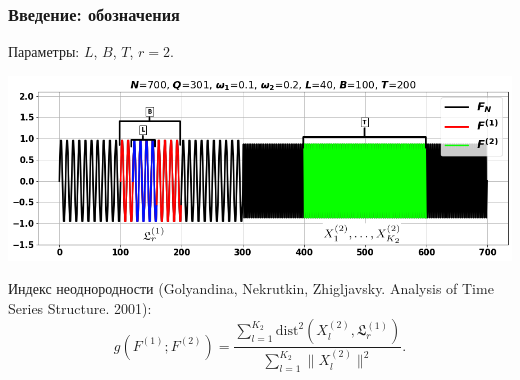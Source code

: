 \documentclass[pdf, 9pt,intlimits, unicode]{beamer}
\DeclareMathOperator{\mathspan}{span}
\newcommand\eqdef{\mathrel{\stackrel{\makebox[0pt]{\mbox{\normalfont\tiny def}}}{=}}}
\begin{document}
	\begin{frame}
		\frametitle{Введение: обозначения}	
		{\color{blue} Параметры:} $ L $, $ B $, $ T $, $ r = 2 $.
		\begin{center}
			\includegraphics[width=\linewidth]{imgs/designations}
		\end{center}

		\bigskip
		
		{\color{blue} Индекс неоднородности} (Golyandina, Nekrutkin, Zhigljavsky. Analysis of Time Series Structure. 2001):
		\small{
			$$ g(F^{(1)}; F^{(2)}) = \frac{\sum\limits_{l=1}^{K_2}\mathrm{dist}^2(X_l^{(2)}, \mathfrak{L}_r^{(1)})}{\sum\limits_{l=1}^{K_2}\|X_l^{(2)}\|^2}. $$
		}
	\end{frame}
\end{document}
